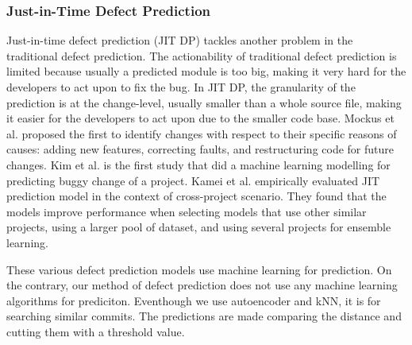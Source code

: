 \subsubsection{Just-in-Time Defect Prediction}
Just-in-time defect prediction (JIT DP) tackles another problem in the traditional defect prediction.
The actionability of traditional defect prediction is limited because usually a predicted module is too big,
making it very hard for the developers to act upon to fix the bug.
In JIT DP, the granularity of the prediction is at the change-level, usually smaller than a whole source file, making it easier for the developers to act upon due to the smaller code base.
Mockus et al. \cite{mockus2000identifying} proposed the first to identify changes with respect to their specific reasons of causes: adding new features, correcting faults, and restructuring code for future changes.
Kim et al. \cite{kim2008classifying} is the first study that did a machine learning modelling for predicting buggy change of a project.
Kamei et al. \cite{kamei2016studying} empirically evaluated JIT prediction model in the context of cross-project scenario.
They found that the models improve performance when selecting models that use other similar projects, using a larger pool of dataset, and using several projects for ensemble learning.  

These various defect prediction models use machine learning for prediction.
On the contrary, our method of defect prediction does not use any machine learning algorithms for prediciton.
Eventhough we use autoencoder and kNN, it is for searching similar commits.
The predictions are made comparing the distance and cutting them with a threshold value.




